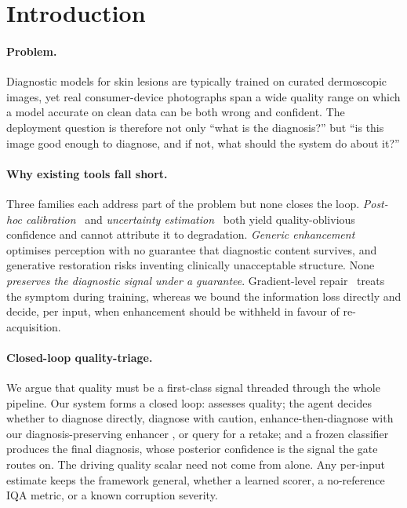 \section{Introduction}\label{sec:intro}

\paragraph{Problem.}
Diagnostic models for skin lesions are typically trained on curated dermoscopic images, yet real
consumer-device photographs span a wide quality range on which a model accurate on clean data can be
both wrong and confident. The deployment question is therefore not only ``what is the diagnosis?'' but
``is this image good enough to diagnose, and if not, what should the system do about it?''

\paragraph{Why existing tools fall short.}
Three families each address part of the problem but none closes the loop.
\emph{Post-hoc calibration}~\citep{guo2017calibration} and \emph{uncertainty
estimation}~\citep{gal2016dropout,lakshminarayanan2017simple} both yield quality-oblivious confidence
and cannot attribute it to degradation. \emph{Generic enhancement}~\citep{wang2021realesrgan,zamir2022restormer}
optimises perception with no guarantee that diagnostic content survives, and generative restoration
risks inventing clinically unacceptable structure. None \emph{preserves the diagnostic signal under a
guarantee}. Gradient-level repair~\citep{gradprom2025} treats the symptom during training, whereas we
bound the information loss directly and decide, per input, when enhancement should be withheld in
favour of re-acquisition.

\paragraph{Closed-loop quality-triage.}
We argue that quality must be a first-class signal threaded through the whole pipeline. Our system
forms a closed loop: \visiscore assesses quality; the agent decides whether to diagnose directly,
diagnose with caution, enhance-then-diagnose with our diagnosis-preserving enhancer \visienhance, or
query for a retake; and a frozen classifier produces the final diagnosis, whose posterior confidence
is the signal the gate routes on. The driving quality scalar need not come from \visiscore alone.
Any per-input estimate keeps the framework general, whether a learned scorer, a no-reference IQA
metric, or a known corruption severity.


